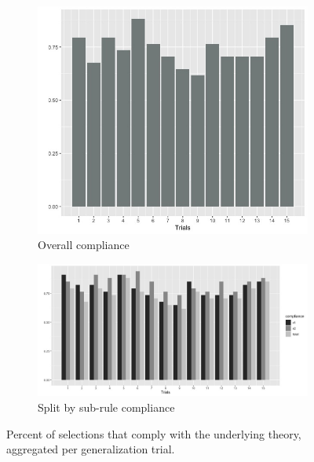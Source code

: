 \documentclass{article}
\begin{document}
\begin{figure}[h!]
  \centering
  \begin{subfigure}[t]{0.35\textwidth}
    \centering
    \includegraphics[width=\linewidth]{total_compliance_per_trial} 
    \caption{Overall compliance}
  \end{subfigure}
  \hfill
  \begin{subfigure}[t]{0.6\textwidth}
    \centering
    \includegraphics[width=\linewidth]{compliance_per_trial} 
    \caption{Split by sub-rule compliance}
  \end{subfigure}
  \caption{Percent of selections that comply with the underlying theory, aggregated per generalization trial.}
  \label{fig:comp_trial}
\end{figure}

\newpage
\end{document}
